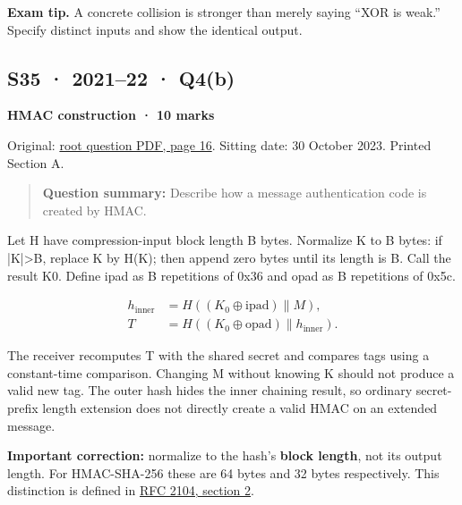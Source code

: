 \documentclass[11pt,a4paper]{article}
\begin{document}
{\color{ForestGreen}\textbf{Exam tip.} A concrete collision is stronger than merely saying “XOR is weak.” Specify distinct inputs and show the identical output.}




\clearpage
\subsection{S35 · 2021–22 · Q4(b)}\label{s35}

\textbf{HMAC construction · 10 marks}


Original: \href{../../CSE405-Security_Merged.pdf\#page=16}{root question PDF,\allowbreak{} page 16}. Sitting date: 30 October 2023. Printed Section A.



\begin{quote}\small

\textbf{Question summary:} Describe how a message authentication code is created by HMAC.



\end{quote}

Let H have compression-input block length B bytes. Normalize K to B bytes: if |K|>B,\allowbreak{} replace K by H(K); then append zero bytes until its length is B. Call the result K0. Define ipad as B repetitions of 0x36 and opad as B repetitions of 0x5c.



\[
\begin{aligned}h_{\mathrm{inner}}&=H\!\left((K_0\oplus\mathrm{ipad})\parallel M\right),\\T&=H\!\left((K_0\oplus\mathrm{opad})\parallel h_{\mathrm{inner}}\right).\end{aligned}
\]

The receiver recomputes T with the shared secret and compares tags using a constant-time comparison. Changing M without knowing K should not produce a valid new tag. The outer hash hides the inner chaining result,\allowbreak{} so ordinary secret-prefix length extension does not directly create a valid HMAC on an extended message.


\textbf{Important correction:} normalize to the hash’s \textbf{block length},\allowbreak{} not its output length. For HMAC-SHA-256 these are 64 bytes and 32 bytes respectively. This distinction is defined in \href{https://www.rfc-editor.org/rfc/rfc2104}{RFC 2104,\allowbreak{} section 2}.
\end{document}

